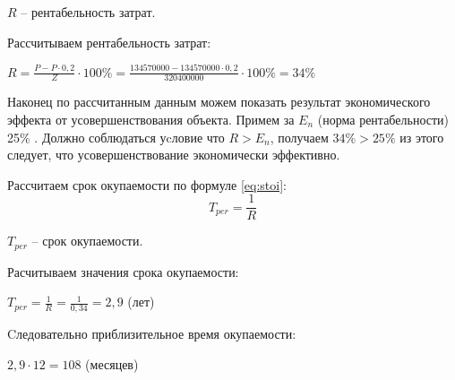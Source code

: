 $R$ -- рентабельность затрат.

Рассчитываем рентабельность затрат:
\begin{flushleft}
\begin{math}
R=\frac{P-P \cdot 0,2}{Z} \cdot 100\% = \frac{134570000 - 134570000 \cdot 0,2}{320400000} \cdot 100\% = 34\% 
\end{math}\end{flushleft}

Наконец по рассчитанным данным можем показать результат экономического эффекта от усовершенствования объекта. Примем  за $E_{n}$ (норма рентабельности) 25\% . Должно соблюдаться уcловие что $R>E_{n}$, получаем $34\%>25\%$ из этого следует, что усовершенствование экономически эффективно.

Рассчитаем срок окупаемости по формуле \ref{eq:stoi}:
\begin{equation}\label{eq:stoi}
T_{per}=\frac{1}{R}
\end{equation}

$T_{per}$ -- срок окупаемости.

Расчитываем значения срока окупаемости:
\begin{flushleft}
\begin{math}
T_{per}=\frac{1}{R} = \frac{1}{0,34} = 2,9 
\end{math} (лет)\end{flushleft}

Cледовательно приблизительное время окупаемости:
\begin{flushleft}
\begin{math}
2,9 \cdot 12 = 108
\end{math} (месяцев)\end{flushleft}  

\pagebreak